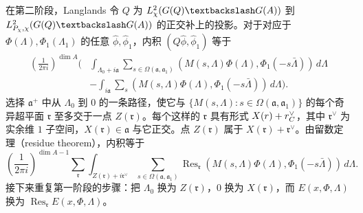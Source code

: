 在第二阶段，Langlands 令 $Q$ 为 $L_\chi^2(G(\Q)\backslash G(A))$ 到
$L_{\mathcal P_\chi,\chi}^2(G(\Q)\backslash G(A))$ 的正交补上的投影。对于对应于 $\Phi(\Lambda),\Phi_1(\Lambda_1)$ 的任意 $\widehat\phi,\widehat\phi_1$，内积 $(Q\widehat\phi,\widehat\phi_1)$ 等于
\[
\begin{split}
 \left(\frac1{2\pi i}\right)^{\dim A}\Bigg(&
 \int_{\Lambda_0+i\mathfrak a}\sum_{s\in\Omega(\mathfrak a,\mathfrak a_1)}
 (M(s,\Lambda)\Phi(\Lambda),\Phi_1(-s\bar\Lambda))\,d\Lambda\\
 &-\int_{i\mathfrak a}\sum_s
 (M(s,\Lambda)\Phi(\Lambda),\Phi_1(-s\bar\Lambda))\,d\Lambda\Bigg).
\end{split}
\]
选择 $\mathfrak a^+$ 中从 $\Lambda_0$ 到 $0$ 的一条路径，使它与
$\{M(s,\Lambda):s\in\Omega(\mathfrak a,\mathfrak a_1)\}$ 的每个奇异超平面 $\mathfrak r$ 至多交于一点 $Z(\mathfrak r)$。每个这样的 $\mathfrak r$ 具有形式
$X(r)+r_C^\vee$，其中 $\mathfrak r^\vee$ 为实余维 $1$ 子空间，$X(\mathfrak r)\in\mathfrak a$ 与它正交。点 $Z(\mathfrak r)$ 属于
$X(\mathfrak r)+\mathfrak r^\vee$。由留数定理（residue theorem），内积等于
\[
 \left(\frac1{2\pi i}\right)^{\dim A-1}\sum_\mathfrak r
 \int_{Z(\mathfrak r)+i\mathfrak r^\vee}
 \sum_{s\in\Omega(\mathfrak a,\mathfrak a_1)}
 \operatorname{Res}_\mathfrak r(M(s,\Lambda)\Phi(\Lambda),\Phi_1(-s\bar\Lambda))\,d\Lambda.
\]
接下来重复第一阶段的步骤：把 $\Lambda_0$ 换为 $Z(\mathfrak r)$，$0$ 换为 $X(\mathfrak r)$，而 $E(x,\Phi,\Lambda)$ 换为 $\operatorname{Res}_\mathfrak r E(x,\Phi,\Lambda)$。

